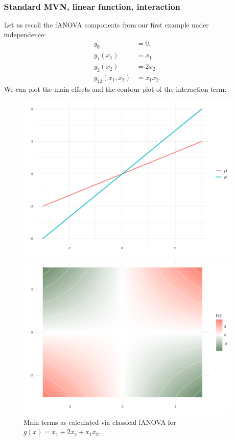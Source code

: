 \subsubsection*{Standard MVN, linear function, interaction}
Let us recall the fANOVA components from our first example under independence:
\begin{align*}
y_{\emptyset} &= 0, \\
y_1(x_1) &= x_1\\
y_2(x_2) &= 2x_2\\
y_{12}(x_1, x_2) &= x_1x_2.
\end{align*}
We can plot the main effects and the contour plot of the interaction term:
\begin{figure}[htpb]
    \centering
    \begin{minipage}[t]{0.49\textwidth}
        \centering
        \includegraphics[width=\textwidth]{images/p_main_effect_ex1.png}
        \caption{Main terms as calculated via classical fANOVA for $g(x) = x_1 + 2 x_2 + x_1 x_2$.}
        \label{fig:main_effects_ex1}
    \end{minipage}%
    \hfill
    \begin{minipage}[t]{0.49\textwidth}
        \centering
        \includegraphics[width=\textwidth]{images/p_contour_ex1.png}

\end{minipage}
\end{figure}
